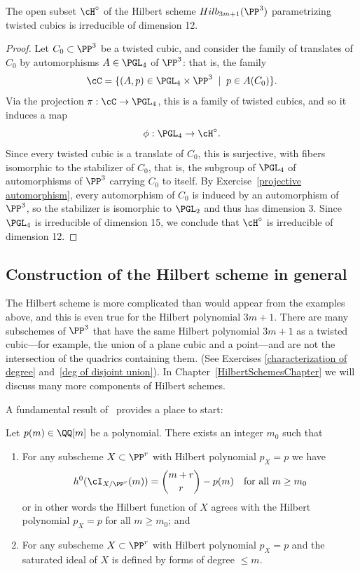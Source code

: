 \begin{proposition}\label{hilb of twisted cubics}
The open subset $\cH^\circ$ of the Hilbert scheme $Hilb_{3m+1}(\PP^3)$ parametrizing twisted cubics is irreducible of dimension 12.
\end{proposition}

\begin{proof}  Let $C_0 \subset \PP^3$ be a twisted cubic, and consider the family of translates of $C_0$ by automorphisms $A \in \PGL_4$ of $\PP^3$: that is, the family
$$
\cC = \{ (A, p) \in \PGL_4 \times \PP^3 \; \mid \; p \in A(C_0) \}.
$$
Via the projection $\pi : \cC \to \PGL_4$, this is a family of twisted cubics, and so it induces a map
$$
\phi : \PGL_4 \to \cH^\circ.
$$
Since every twisted cubic is a translate of $C_0$, this is surjective, with fibers isomorphic to the stabilizer of $C_0$, that is, the subgroup of $\PGL_4$ of automorphisms of $\PP^3$ carrying $C_0$ to itself. By Exercise~\ref{projective automorphism}, every automorphism of $C_{0}$ is induced by an automorphism of $\PP^{3}$, so the stabilizer is isomorphic to $\PGL_2$ and  thus has dimension 3. Since $\PGL_4$ is irreducible of dimension 15, we conclude that $\cH^\circ$ is irreducible of dimension 12.
\end{proof}


\subsection{Construction of the Hilbert scheme in general}\label{hilb construction}

The Hilbert scheme is more complicated than would appear from the examples above, and this is even true
for the Hilbert polynomial $3m+1$. There are many subschemes of $\PP^3$ that have the same Hilbert polynomial $3m+1$ as a twisted cubic---for example, the union of a plane cubic and a point---and are not the intersection of the quadrics containing them. (See Exercises \ref{characterization of degree} and~\ref{deg of disjoint union}). In Chapter~\ref{HilbertSchemesChapter} we will discuss many more components of Hilbert schemes.

A fundamental result of~\cite{Matsusaka} provides a place to start:

\begin{lemma}\label{matsusaka}
Let $p(m) \in \QQ[m]$ be a polynomial. There exists an integer $m_0$ such that

\begin{enumerate}  

\item For any subscheme $X \subset \PP^r$ with Hilbert polynomial $p_X = p$ we have
$$
h^0(\cI_{X/\PP^r}(m)) = \binom{m+r}{r} - p(m) \quad \text{for all } m \geq m_0
$$
or in other words the Hilbert function of $X$ agrees with the Hilbert polynomial $p_X = p$ for all $m \geq m_0$; and

\item For any subscheme $X \subset \PP^r$ with Hilbert polynomial $p_X = p$ and
the saturated ideal of $X$ is defined by forms of degree $\leq m$.
\end{enumerate}
\end{lemma}

